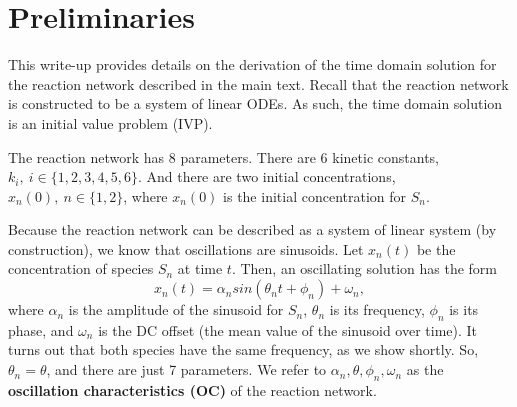 \documentclass{bmcart}
\begin{document}




\section{Preliminaries}

This write-up provides details on the derivation of the
time domain solution for the reaction network described in the main text.
Recall that the reaction network is constructed to be a system
of linear ODEs.
As such, the time domain solution is an initial value problem (IVP).


    The reaction network has 8 parameters. There are 6 kinetic constants,
$k_i,~ i\in \{1, 2, 3, 4, 5, 6\}$. And there are two initial
concentrations, $x_n (0),~ n \in \{1, 2 \}$, where $x_n(0)$ is the
initial concentration for $S_n$.

Because the reaction network can be described as a 
system of linear system (by construction), we
know that oscillations are sinusoids.
Let $x_n (t)$ be the concentration
of species $S_n$ at time $t$. Then, an oscillating solution has the
form \begin{equation*}
x_n(t) = \alpha_n sin(\theta_n t + \phi_n) + \omega_n,
\end{equation*} where $\alpha_n$ is the amplitude of the sinusoid for
$S_n$, $\theta_n$ is its frequency, $\phi_n$ is its phase, and
$\omega_n$ is the DC offset (the mean value of the sinusoid over
time).
It turns out that both species have the same frequency, as we show shortly.
So, $\theta_n = \theta$, and there are just 7 parameters.
We refer to $\alpha_n, \theta, \phi_n, \omega_n$ as the
\textbf{oscillation characteristics (OC)} of the reaction network.
\end{document}
